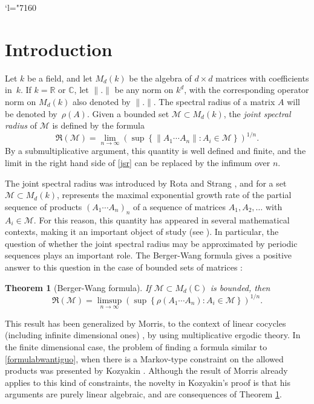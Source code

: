\documentclass[JEP,XML,SOM,Unicode,NoEqCountersInSection]{cedram}
\let\mathcal\mathscr
\newcommand{\Changel}{\mathcode`l="7160}
\theoremstyle{plain}
\newtheorem{teo}{Theorem}[section]
\theoremstyle{definition}
\newcommand{\CC}{\mathbb{C}}
\newcommand{\RR}{\mathbb{R}}
\newcommand{\corchete}[1]{\left\{{#1}\right\}}
\begin{document}
\maketitle
\tableofcontents
\mainmatter
\Changel

\section{Introduction}
Let $k$ be a field, and let $M_{d}(k)$ be the algebra of $d\times d$ matrices with coefficients in~$k$. If $k=\RR$ or $\CC$, let $\|.\|$ be any norm on $k^d$, with the corresponding operator norm on $M_{d}(k)$ also denoted by $\|.\|$. The spectral radius of a matrix $A$ will be denoted by~$\rho(A)$. Given a bounded set $\mathcal{M}\subset M_{d}(k)$, the \textit{joint spectral radius} of $\mathcal{M}$ is defined by the formula
\begin{equation}\label{jsr}
\mathfrak{R}(\mathcal{M})=\lim_{n\to \infty}{\left(\sup \corchete{\|A_{1}\cdots A_{n}\| : A_{i}\in \mathcal{M} }\right)^{1/n}}.
\end{equation}
By a submultiplicative argument, this quantity is well defined and finite, and the limit in the right hand side of \eqref{jsr} can be replaced by the infimum over $n$.

The joint spectral radius was introduced by Rota and Strang \cite{rota}, and for a set $\mathcal{M}\subset M_{d}(k)$, represents the maximal exponential growth rate of the partial sequence of products $(A_1\cdots A_n)_{n}$ of a sequence of matrices $A_1,A_2,\dots$ with $A_i\in \mathcal{M}$. For this reason, this quantity has appeared in several mathematical contexts, making it an important object of study (see \eg \cite{gur,jun,mathermorris,tsblo}). In particular, the question of whether the joint spectral radius may be approximated by periodic sequences plays an important role. The Berger-Wang formula gives a positive answer to this question in the case of bounded sets of matrices \cite{bw}:

\begin{teo}[Berger-Wang formula]\label{bergerwangantiguo}
If $\mathcal{M}\subset M_{d}(\CC)$ is bounded, then
\begin{equation}\label{formulabwantiguo}
\mathfrak{R}(\mathcal{M})=\limsup_{n\to \infty}{\left(\sup\corchete{\rho(A_{1}\cdots A_{n}) : A_{i}\in \mathcal{M}}\right)^{1/n}}.
\end{equation}
\end{teo}
This result has been generalized by Morris, to the context of linear cocycles (including infinite dimensional ones) \cite{morrisbw}, by using multiplicative ergodic theory. In the finite dimensional case, the problem of finding a formula similar to \eqref{formulabwantiguo}, when there is a Markov-type constraint on the allowed products was presented by Kozyakin \cite{kozyakin}. Although the result of Morris already applies to this kind of constraints, the novelty in Kozyakin's proof is that his arguments are purely linear algebraic, and are consequences of Theorem \ref{bergerwangantiguo}.
\end{document}
